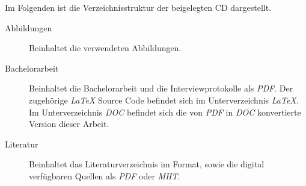 \label{cha:Beigaben}

Im Folgenden ist die Verzeichnisstruktur der beigelegten CD dargestellt.
 
\begin{description}
	\item[Abbildungen]
		Beinhaltet die verwendeten Abbildungen.
	\item[Bachelorarbeit]
		Beinhaltet die Bachelorarbeit und die Interviewprotokolle als \textit{PDF}.
		Der zugehörige \emph{\LaTeX{}} Source Code befindet sich im Unterverzeichnis \textit{LaTeX}.
		Im Unterverzeichnis \textit{DOC} befindet sich die von \textit{PDF} in \textit{DOC} konvertierte Version dieser Arbeit.
	\item[Literatur]
		Beinhaltet das Literaturverzeichnis im \textit{\BibTeX{}} Format, sowie die digital verfügbaren Quellen als \textit{PDF} oder \textit{MHT}.
\end{description}